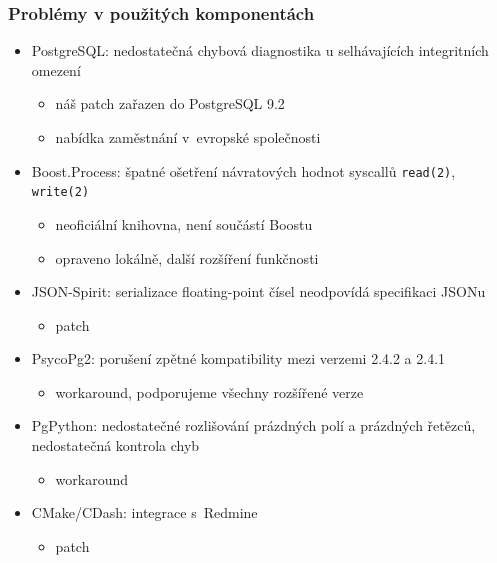 \documentclass{beamer}
\begin{document}
\begin{frame}[fragile]
\frametitle{Problémy v použitých komponentách}
\begin{itemize}
    \item PostgreSQL: nedostatečná chybová diagnostika u selhávajících integritních omezení
        \begin{itemize}
            \item náš patch zařazen do PostgreSQL 9.2
            \item nabídka zaměstnání v~evropské společnosti
        \end{itemize}
    \item Boost.Process: špatné ošetření návratových hodnot syscallů {\tt read(2)}, {\tt write(2)}
        \begin{itemize}
            \item neoficiální knihovna, není součástí Boostu
            \item opraveno lokálně, další rozšíření funkčnosti
        \end{itemize}
    \item JSON-Spirit: serializace floating-point čísel neodpovídá specifikaci JSONu
        \begin{itemize}
            \item patch
        \end{itemize}
    \item PsycoPg2: porušení zpětné kompatibility mezi verzemi 2.4.2 a 2.4.1
        \begin{itemize}
            \item workaround, podporujeme všechny rozšířené verze
        \end{itemize}
    \item PgPython: nedostatečné rozlišování prázdných polí a prázdných řetězců, nedostatečná kontrola chyb
        \begin{itemize}
            \item workaround
        \end{itemize}
    \item CMake/CDash: integrace s~Redmine
        \begin{itemize}
            \item patch
        \end{itemize}
\end{itemize}
\end{frame}
\end{document}
